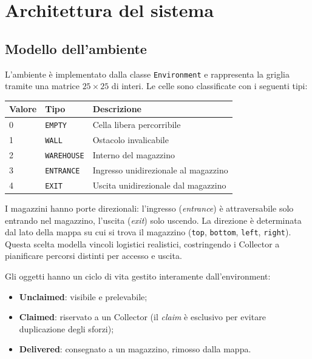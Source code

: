 \section{Architettura del sistema}
\label{sec:architettura}

\subsection{Modello dell'ambiente}

L'ambiente è implementato dalla classe \texttt{Environment} e rappresenta la griglia tramite una matrice $25 \times 25$ di interi. Le celle sono classificate con i seguenti tipi:

\begin{center}
\begin{tabular}{lll}
\toprule
\textbf{Valore} & \textbf{Tipo} & \textbf{Descrizione} \\
\midrule
0 & \texttt{EMPTY}    & Cella libera percorribile \\
1 & \texttt{WALL}     & Ostacolo invalicabile \\
2 & \texttt{WAREHOUSE}& Interno del magazzino \\
3 & \texttt{ENTRANCE} & Ingresso unidirezionale al magazzino \\
4 & \texttt{EXIT}     & Uscita unidirezionale dal magazzino \\
\bottomrule
\end{tabular}
\end{center}

I magazzini hanno porte direzionali: l'ingresso (\emph{entrance}) è attraversabile solo entrando nel magazzino, l'uscita (\emph{exit}) solo uscendo. La direzione è determinata dal lato della mappa su cui si trova il magazzino (\texttt{top}, \texttt{bottom}, \texttt{left}, \texttt{right}). Questa scelta modella vincoli logistici realistici, costringendo i Collector a pianificare percorsi distinti per accesso e uscita.

Gli oggetti hanno un ciclo di vita gestito interamente dall'environment:
\begin{itemize}
  \item \textbf{Unclaimed}: visibile e prelevabile;
  \item \textbf{Claimed}: riservato a un Collector (il \emph{claim} è esclusivo per evitare duplicazione degli sforzi);
  \item \textbf{Delivered}: consegnato a un magazzino, rimosso dalla mappa.
\end{itemize}

